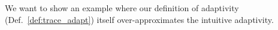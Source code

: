 
We want to show an example where our definition of adaptivity (Def.~\ref{def:trace_adapt}) itself
over-approximates the intuitive adaptivity.
%    
